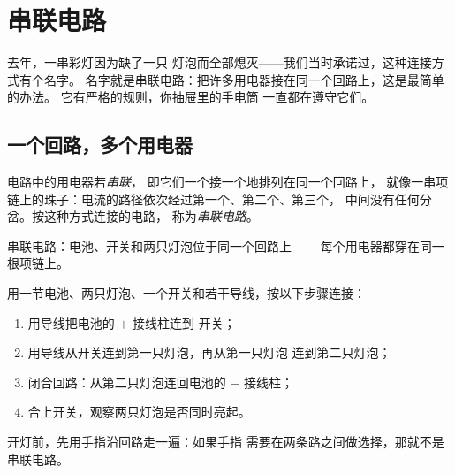 \chapter{串联电路}\label{ch:g4:series-circuits}

去年，一串彩灯因为缺了一只
灯泡而全部熄灭——我们当时承诺过，这种连接方式有个名字。
名字就是串联电路：把许多用电器接在同一个回路上，这是最简单的办法。
它有严格的规则，你抽屉里的手电筒
一直都在遵守它们。

\section{一个回路，多个用电器}

\begin{definition}[串联]\label{def:g4:series-circuits:series}
电路中的用电器若\emph{串联}，
即它们一个接一个地排列在同一个回路上，
就像一串项链上的珠子：电流的路径依次经过第一个、第二个、第三个，
中间没有任何分岔。按这种方式连接的电路，
称为\emph{串联电路}。
\end{definition}

\begin{omfigure}

{\small 串联电路：电池、开关和两只灯泡位于同一个回路上——
每个用电器都穿在同一根项链上。}
\end{omfigure}

\begin{method}[搭建电路]\label{met:g4:series-circuits:build}
用一节电池、两只灯泡、一个开关和若干导线，按以下步骤连接：
\begin{enumerate}
  \item 用导线把电池的 $+$ 接线柱连到
        开关；
  \item 用导线从开关连到第一只灯泡，再从第一只灯泡
        连到第二只灯泡；
  \item 闭合回路：从第二只灯泡连回电池的
        $-$ 接线柱；
  \item 合上开关，观察两只灯泡是否同时亮起。
\end{enumerate}
开灯前，先用手指沿回路走一遍：如果手指
需要在两条路之间做选择，那就不是串联电路。
\end{method}

